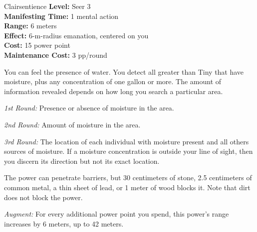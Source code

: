 {Clairsentience}
{
	\textbf{Level:}
	Seer 3\\
	\textbf{Manifesting Time:}
	1 mental action\\
	\textbf{Range:}
	6 meters\\
	\textbf{Effect:}
	6-m-radius emanation, centered on you\\
	\textbf{Cost:}
	15 power point\\
	\textbf{Maintenance Cost:}
	3 pp/round\\
}
{
	You can feel the presence of water. You detect all greater than Tiny that have moisture, plus any concentration of one gallon or more. The amount of information revealed depends on how long you search a particular area.

	\textit{1st Round:} Presence or absence of moisture in the area.

	\textit{2nd Round:} Amount of moisture in the area.

	\textit{3rd Round:} The location of each individual with moisture present and all others sources of moisture. If a moisture concentration is outside your line of sight, then you discern its direction but not its exact location.

	The power can penetrate barriers, but 30 centimeters of stone, 2.5 centimeters of common metal, a thin sheet of lead, or 1 meter of wood blocks it. Note that dirt does not block the power.

	\textit{Augment:} For every additional power point you spend, this power's range increases by 6 meters, up to 42 meters.
}